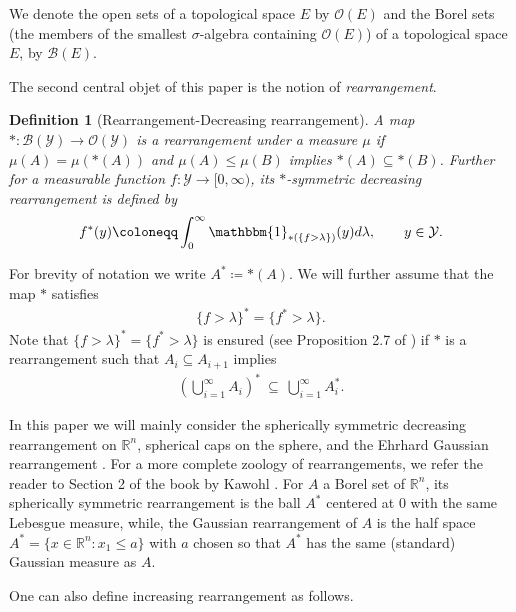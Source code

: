 \documentclass[11pt]{article}
\newtheorem{definition}[conjecture]{Definition}
\newcommand{\1}{[1]}
\begin{document}
We denote the open sets of a topological space $E$ by $\mathcal{O}(E)$ and the Borel sets (the members of the smallest $\sigma$-algebra containing $\mathcal{O}(E)$) of a topological space $E$, by $\mathcal{B}(E)$.

The second central objet of this paper is the notion of \emph{rearrangement}.

\begin{definition}[Rearrangement-Decreasing rearrangement]
    A map $*: \mathcal{B}(\mathcal{Y}) \to \mathcal{O}(\mathcal{Y})$ is a \emph{rearrangement} under a measure $\mu$ if $\mu(A) = \mu(*(A))$ and $\mu(A) \leq \mu(B)$ implies $*(A) \subseteq *(B)$.  Further for a measurable function $f: \mathcal{Y} \to [0,\infty)$, its $*$-symmetric \emph{decreasing rearrangement} is defined by
    \begin{align*}
        f^*(y) \coloneqq  \int_0^\infty \mathbbm{1}_{ *(\{ f> \lambda \})} (y) d \lambda, \qquad y \in \mathcal{Y}.
    \end{align*}
\end{definition}

For brevity of notation we write $A^* \coloneqq *(A)$.  We will further assume that the map $*$ satisfies 
\begin{align} \label{eq: decreasing rearrangment characterization}
    \{ f > \lambda \}^*  = \{ f^* > \lambda \}.
\end{align}  Note that $\{ f > \lambda \}^*  = \{ f^* > \lambda \}$ is ensured (see Proposition 2.7 of \cite{melbourne2019rearrangement}) if $*$ is a rearrangement such that $A_i \subseteq A_{i+1}$ implies 
\begin{align} \label{eq: rearrangement requirement}
        \left( \bigcup_{i=1}^\infty A_i \right)^* \ \subseteq \ \bigcup_{i=1}^\infty A_i^*.
\end{align}

In this paper we will mainly consider the spherically symmetric decreasing rearrangement on $\mathbb{R}^n$, spherical caps on the sphere, and the Ehrhard Gaussian rearrangement \cite{ehrhard}. 
For a more complete zoology of rearrangements, we refer the reader  to Section 2 of the book by Kawohl \cite{kawohl}.
For $A$ a Borel set of $\mathbb{R}^n$,
its  spherically symmetric rearrangement is the ball $A^*$ centered at $0$ with the same Lebesgue measure, while, the Gaussian rearrangement of $A$ is the half space
$A^*=\{x \in \mathbb{R}^n: x_1 \leq a\}$ with $a$ chosen so that 
$A^*$ has the same (standard) Gaussian measure as $A$. 

One can also define increasing rearrangement as follows. 
\end{document}
